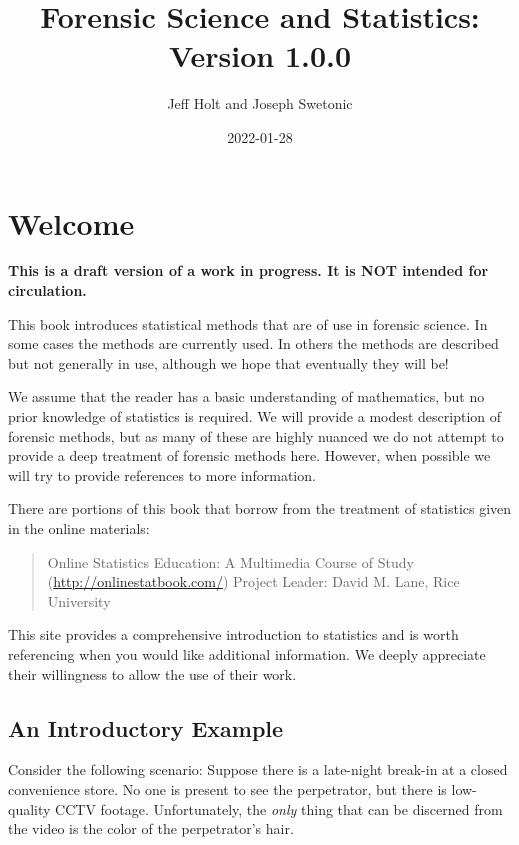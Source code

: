 \documentclass[
]{book}
\title{Forensic Science and Statistics: Version 1.0.0}
\author{Jeff Holt and Joseph Swetonic}
\date{2022-01-28}
\begin{document}
\maketitle

{
\setcounter{tocdepth}{1}
\tableofcontents
}
\hypertarget{welcome}{%
\chapter{Welcome}\label{welcome}}

\textbf{This is a draft version of a work in progress. It is NOT intended for circulation.}

This book introduces statistical methods that are of use in forensic science.
In some cases the methods are currently used.
In others the methods are described but not generally in use,
although we hope that eventually they will be!

We assume that the reader has a basic understanding of mathematics, but no prior
knowledge of statistics is required.
We will provide a modest description of forensic methods, but as many of these are
highly nuanced we do not attempt to
provide a deep treatment of forensic methods here. However, when possible we will
try to provide references to more information.

There are portions of this book that borrow from the treatment of statistics
given in the online materials:

\begin{quote}
Online Statistics Education: A Multimedia Course of Study (\url{http://onlinestatbook.com/})
Project Leader: David M. Lane, Rice University
\end{quote}

This site provides a comprehensive introduction to statistics and is worth referencing when you would like additional information.
We deeply appreciate their willingness to allow the use of their work.

\hypertarget{an-introductory-example}{%
\section{An Introductory Example}\label{an-introductory-example}}

Consider the following scenario:
Suppose there is a late-night break-in at a closed convenience store.
No one is present to see the perpetrator, but there is low-quality CCTV footage.
Unfortunately, the \emph{only} thing that can be discerned from the video is the
color of the perpetrator's hair.
\end{document}
